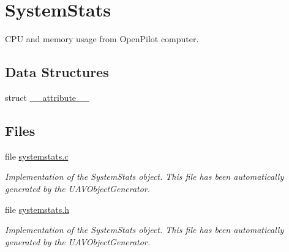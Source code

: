\hypertarget{group___system_stats}{\section{\-System\-Stats}
\label{group___system_stats}
}


\-C\-P\-U and memory usage from \-Open\-Pilot computer.  


\subsection*{\-Data \-Structures}
\begin{DoxyCompactItemize}
\item 
struct \hyperlink{struct____attribute____}{\-\_\-\-\_\-attribute\-\_\-\-\_\-}
\end{DoxyCompactItemize}
\subsection*{\-Files}
\begin{DoxyCompactItemize}
\item 
file \hyperlink{systemstats_8c}{systemstats.\-c}
\begin{DoxyCompactList}\small\item\em \-Implementation of the \-System\-Stats object. \-This file has been automatically generated by the \-U\-A\-V\-Object\-Generator. \end{DoxyCompactList}\item 
file \hyperlink{systemstats_8h}{systemstats.\-h}
\begin{DoxyCompactList}\small\item\em \-Implementation of the \-System\-Stats object. \-This file has been automatically generated by the \-U\-A\-V\-Object\-Generator. \end{DoxyCompactList}\end{DoxyCompactItemize}
